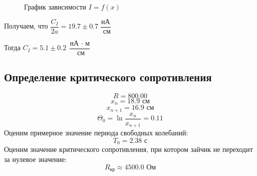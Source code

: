 \documentclass[a4paper, 12pt]{article}
\begin{document}
	\begin {figure}[H]
		\begin{center}
			\caption{График зависимости $I = f(x)$}
		\end{center}
	\end {figure}

Получаем, что $\dfrac{C_I}{2a} = 19.7 \pm 0.7 \; \dfrac{\text{нА}}{\text{ см}}$

Тогда $C_I = 5.1 \pm 0.2 \; \dfrac{\text{нА $\cdot$ м}}{\text{ см}}$
	
\subsection*{Определение критического сопротивления}
$$R = 800.00$$
$$x_n = 18.9 \text{ см}$$
$$x_{n+1} = 16.9 \text{ см}$$
$$\Theta_0 = \ln \dfrac{x_n}{x_{n+1}} = 0.11$$	
Оценим примерное значение периода свободных колебаний:
$$T_0 = 2.38 \text{ с}$$
Оценим значение критического сопротивления, при котором зайчик не переходит за нулевое значение:
$$R_{\text{кр}} \approx 4500.0 \text{ Ом}$$
\end{document}
